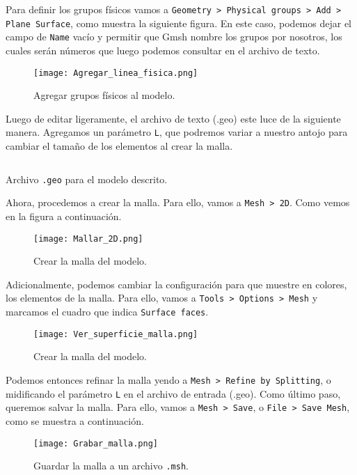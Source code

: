 Para definir los grupos físicos vamos a  \texttt{Geometry > Physical groups > Add > Plane Surface}, como muestra la siguiente figura. En este caso, podemos dejar el campo de \texttt{Name} vacío y permitir que Gmsh nombre los grupos por nosotros, los cuales serán números que luego podemos consultar en el archivo de texto.
\begin{figure}[H]
    \centering
    \texttt{[image: Agregar\_linea\_fisica.png]}
    \caption{Agregar grupos físicos al modelo.}
\end{figure}

Luego de editar ligeramente, el archivo de texto (.geo) este luce de la siguiente manera. Agregamos un parámetro \texttt{L}, que podremos variar a nuestro antojo para cambiar el tamaño de los elementos al crear la malla.
\begin{listing}[H]
    \inputminted[mathescape,
    linenos,
    numbersep=5pt,
    gobble=0,
    frame=lines,
    framesep=2mm]{c}{src/tutorial/Prueba_brasilera.geo}
    \caption{Archivo \texttt{.geo} para el modelo descrito.}
    \label{lst:geo}
\end{listing}

Ahora, procedemos a crear la malla. Para ello,  vamos a \texttt{Mesh > 2D}.  Como vemos en la figura a continuación.
\begin{figure}[H]
    \centering
    \texttt{[image: Mallar\_2D.png]}
    \caption{Crear la malla del modelo.}
\end{figure}

Adicionalmente, podemos cambiar la configuración para que muestre en colores, los elementos de la malla. Para ello, vamos a \texttt{Tools > Options > Mesh} y marcamos el cuadro que indica \texttt{Surface faces}.
\begin{figure}[H]
    \centering
    \texttt{[image: Ver\_superficie\_malla.png]}
    \caption{Crear la malla del modelo.}
\end{figure}

Podemos entonces refinar la malla yendo a \texttt{Mesh > Refine by Splitting}, o midificando el parámetro \texttt{L} en el archivo de entrada (.geo). Como último paso, queremos salvar la malla. Para ello, vamos a \texttt{Mesh > Save}, o \texttt{File > Save Mesh}, como se muestra a continuación.
\begin{figure}[H]
    \centering
    \texttt{[image: Grabar\_malla.png]}
    \caption{Guardar la malla a un archivo \texttt{.msh}.}
\end{figure}



